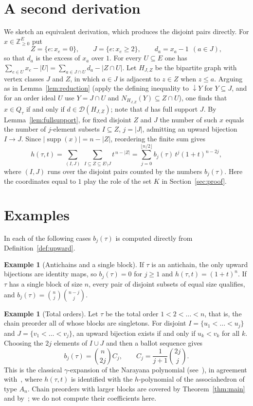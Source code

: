\documentclass[11pt]{amsart}
\theoremstyle{definition}
\newtheorem{example}[theorem]{Example}
\theoremstyle{remark}
\numberwithin{equation}{section}
\newcommand{\Zge}{\mathbb{Z}_{\ge 0}}
\newcommand{\supp}{\operatorname{supp}}
\newcommand{\Dr}{\mathcal{D}}
\newcommand{\down}{{\downarrow}}
\begin{document}
\section{A second derivation}\label{sec:second}

We sketch an equivalent derivation, which produces the disjoint pairs directly. For $x\in\Zge^E$ put
\[
Z=\{e: x_e=0\},\qquad J=\{e : x_e\ge 2\},\qquad d_a=x_a-1\ \ (a\in J),
\]
so that $d_a$ is the excess of $x_a$ over $1$. For every $U\subseteq E$ one has $\sum_{e\in U}x_e-|U|=\sum_{a\in J\cap U}d_a-|Z\cap U|$. Let $H_{J,Z}$ be the bipartite graph with vertex classes $J$ and $Z$, in which $a\in J$ is adjacent to $z\in Z$ when $z\le a$. Arguing as in Lemma~\ref{lem:reduction} (apply the defining inequality to $\down Y$ for $Y\subseteq J$, and for an order ideal $U$ use $Y=J\cap U$ and $N_{H_{J,Z}}(Y)\subseteq Z\cap U$), one finds that $x\in Q_\tau$ if and only if $d\in\Dr(H_{J,Z})$; note that $d$ has full support $J$. By Lemma~\ref{lem:fullsupport}, for fixed disjoint $Z$ and $J$ the number of such $x$ equals the number of $j$-element subsets $I\subseteq Z$, $j=|J|$, admitting an upward bijection $I\to J$. Since $|\supp(x)|=n-|Z|$, reordering the finite sum gives
\[
h(\tau,t)=\sum_{(I,J)}\ \sum_{I\subseteq Z\subseteq E\setminus J} t^{\,n-|Z|}=\sum_{j=0}^{\lfloor n/2\rfloor}b_j(\tau)\,t^j(1+t)^{n-2j},
\]
where $(I,J)$ runs over the disjoint pairs counted by the numbers $b_j(\tau)$. Here the coordinates equal to $1$ play the role of the set $K$ in Section~\ref{sec:proof}.

\section{Examples}\label{sec:examples}

In each of the following cases $b_j(\tau)$ is computed directly from Definition~\ref{def:upward}.

\begin{example}[Antichains and a single block]
If $\tau$ is an antichain, the only upward bijections are identity maps, so $b_j(\tau)=0$ for $j\ge 1$ and $h(\tau,t)=(1+t)^n$. If $\tau$ has a single block of size $n$, every pair of disjoint subsets of equal size qualifies, and $b_j(\tau)=\binom{n}{j}\binom{n-j}{j}$.
\end{example}

\begin{example}[Total orders]
Let $\tau$ be the total order $1<2<\dots<n$, that is, the chain preorder all of whose blocks are singletons. For disjoint $I=\{u_1<\dots<u_j\}$ and $J=\{v_1<\dots<v_j\}$, an upward bijection exists if and only if $u_k<v_k$ for all $k$. Choosing the $2j$ elements of $I\cup J$ and then a ballot sequence gives
\[
b_j(\tau)=\binom{n}{2j}C_j,\qquad C_j=\frac{1}{j+1}\binom{2j}{j}.
\]
This is the classical $\gamma$-expansion of the Narayana polynomial (see~\cite{Ath18}), in agreement with~\cite{Cha}, where $h(\tau,t)$ is identified with the $h$-polynomial of the associahedron of type $A_n$. Chain preorders with larger blocks are covered by Theorem~\ref{thm:main} and by~\cite{Ath25}; we do not compute their coefficients here.
\end{example}
\end{document}
